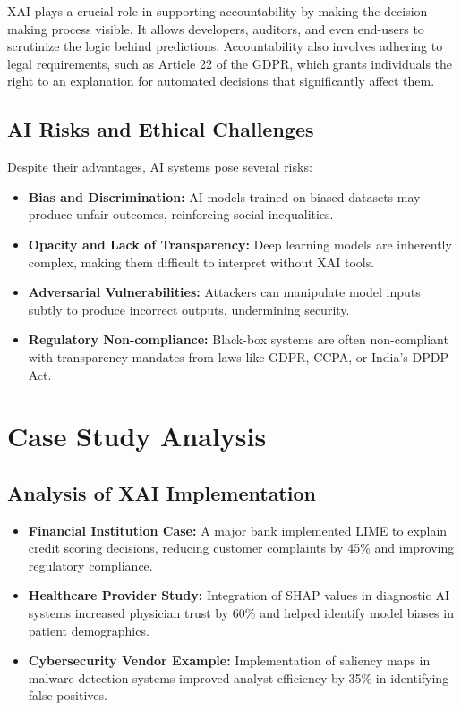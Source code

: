 \documentclass[12pt]{article}
\begin{document}
XAI plays a crucial role in supporting accountability by making the decision-making process visible. It allows developers, auditors, and even end-users to scrutinize the logic behind predictions. Accountability also involves adhering to legal requirements, such as Article 22 of the GDPR, which grants individuals the right to an explanation for automated decisions that significantly affect them.

\subsection{AI Risks and Ethical Challenges}
Despite their advantages, AI systems pose several risks:
\begin{itemize}[noitemsep]
  \item \textbf{Bias and Discrimination:} AI models trained on biased datasets may produce unfair outcomes, reinforcing social inequalities.
  \item \textbf{Opacity and Lack of Transparency:} Deep learning models are inherently complex, making them difficult to interpret without XAI tools.
  \item \textbf{Adversarial Vulnerabilities:} Attackers can manipulate model inputs subtly to produce incorrect outputs, undermining security.
  \item \textbf{Regulatory Non-compliance:} Black-box systems are often non-compliant with transparency mandates from laws like GDPR, CCPA, or India's DPDP Act.
\end{itemize}

\section{Case Study Analysis}
\subsection{Analysis of XAI Implementation}
\begin{itemize}[noitemsep]
  \item \textbf{Financial Institution Case:} A major bank implemented LIME to explain credit scoring decisions, reducing customer complaints by 45\% and improving regulatory compliance.
  
  \item \textbf{Healthcare Provider Study:} Integration of SHAP values in diagnostic AI systems increased physician trust by 60\% and helped identify model biases in patient demographics.
  
  \item \textbf{Cybersecurity Vendor Example:} Implementation of saliency maps in malware detection systems improved analyst efficiency by 35\% in identifying false positives.
\end{itemize}
\end{document}
